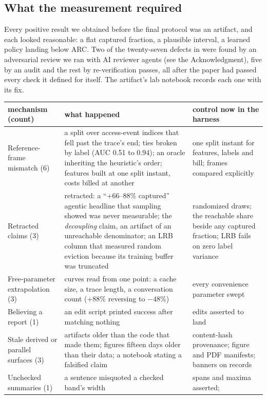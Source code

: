 \subsection{What the measurement required}
\label{sec:protocol}
Every positive result we obtained before the final protocol was an artifact, and each looked reasonable:
a flat captured fraction, a plausible interval, a learned policy landing below ARC. Two of the
twenty-seven defects in  were found by an adversarial review we ran with AI reviewer
agents (see the Acknowledgment), five by an audit and the rest by re-verification passes, all after the
paper had passed every check it defined for itself. The artifact's lab notebook records each one with
its fix.

\begin{table}[t]
\centering\footnotesize
\begin{tabular}{@{}p{3.2cm}p{8.6cm}p{4.9cm}@{}}
\toprule
mechanism (count) & what happened & control now in the harness \\
\midrule
Reference-frame mismatch (6) & a split over access-event indices that fell past the trace's end; ties
broken by label (AUC 0.51 to 0.94); an oracle inheriting the heuristic's order; features built at one
split instant, costs billed at another & one split instant for features, labels and bill; frames compared
explicitly \\
Retracted claims (3) & retracted: a ``+66--88\% captured'' agentic headline that sampling showed was never
measurable; the \emph{decoupling} claim, an artifact of an unreachable denominator; an LRB column that
measured random eviction because its training buffer was truncated & randomized draws; the reachable
share beside any captured fraction; LRB fails on zero label variance \\
Free-parameter extrapolation (3) & curves read from one point: a cache size, a trace length, a
conversation count (+88\% reversing to $-48\%$) & every convenience parameter swept \\
Believing a report (1) & an edit script printed success after matching nothing & edits asserted to land \\
Stale derived or parallel surfaces (3) & artifacts older than the code that made them; figures fifteen
days older than their data; a notebook stating a falsified claim & content-hash provenance; figure and
PDF manifests; banners on records \\
Unchecked summaries (1) & a sentence misquoted a checked band's width & spans and maxima asserted;

\end{tabular}
\end{table}
